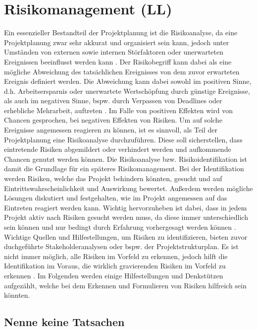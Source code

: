 \documentclass[ThesisDJ.tex]{subfiles}
\begin{document}
\section{Risikomanagement (LL)}
Ein essenzieller Bestandteil der Projektplanung ist die Risikoanalyse, da eine Projektplanung zwar sehr akkurat und organisiert sein kann, jedoch unter Umständen von externen sowie internen Störfaktoren oder unerwarteten Ereignissen beeinflusst werden kann \cite{cicek2022risikomanagement}.
Der Risikobegriff kann dabei als eine mögliche Abweichung des tatsächlichen Ereignisses von dem zuvor erwarteten Ereignis definiert werden. Die Abweichung kann dabei sowohl im positiven Sinne, d.h. Arbeitsersparnis oder unerwartete Wertschöpfung durch günstige Ereignisse, als auch im negativen Sinne, bspw. durch Verpassen von Deadlines oder erhebliche Mehrarbeit, auftreten \cite{holgerseibold2006}. Im Falle von positiven Effekten wird von Chancen gesprochen, bei negativen Effekten von Risiken. Um auf solche Ereignisse angemessen reagieren zu können, ist es sinnvoll, als Teil der Projektplanung eine Risikoanalyse durchzuführen. Diese soll sicherstellen, dass eintretende Risiken abgemildert oder verhindert werden und aufkommende Chancen genutzt werden können. Die Risikoanalyse bzw. Risikoidentifikation ist damit die Grundlage für ein späteres Risikomanagement.
Bei der Identifikation werden Risiken, welche das Projekt behindern könnten, gesucht und auf Eintrittswahrscheinlichkeit und Auswirkung bewertet. Außerdem werden mögliche Lösungen diskutiert und festgehalten, wie im Projekt angemessen auf das Eintreten reagiert werden kann. Wichtig hervorzuheben ist dabei, dass in jedem Projekt aktiv nach Risiken gesucht werden muss, da diese immer unterschiedlich sein können und nur bedingt durch Erfahrung vorhergesagt werden können \cite{cicek2022risikomanagement}. Wichtige Quellen und Hilfestellungen, um Risiken zu identifizieren, bieten zuvor duchgeführte Stakeholderanalysen oder bspw. der Projektstrukturplan. Es ist nicht immer möglich, alle Risiken im Vorfeld zu erkennen, jedoch hilft die Identifikation im Voraus, die wirklich gravierenden Risiken im Vorfeld zu erkennen \cite{holgerseibold2006}. Im Folgenden werden einige Hilfestellungen und Denkstützen aufgezählt, welche bei dem Erkennen und Formulieren von Risiken hilfreich sein könnten.

\subsection{Nenne keine Tatsachen}
\end{document}
